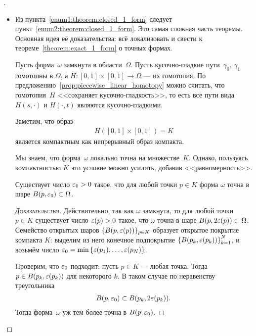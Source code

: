 \documentclass[../complex-analysis.tex]{subfiles}
\begin{document}
\begin{proof}[]\
 \begin{itemize}
  \item Из пункта~\ref{enum1:theorem:closed_1_form} следует пункт~\ref{enum2:theorem:closed_1_form}. Это самая сложная часть теоремы. Основная идея её доказательства: всё  локализовать и свести к теореме~\ref{theorem:exact_1_form} о точных формах.

   Пусть форма~$\omega$ замкнута в области~$\Omega$. Пусть кусочно-гладкие пути~$\gamma_0$, $\gamma_1$ гомотопны в $\Omega$, а $H \colon [0,1] \times [0,1] \to \Omega$ --- их гомотопия. По предложению~\ref{prop:piecewise_linear_homotopy} можно считать, что гомотопия~$ H $ <<сохраняет кусочно-гладкость>>, то есть все пути вида $ H(s, \cdot) $ и $ H(\cdot, t) $ являются кусочно-гладкими.

   Заметим, что образ
   \begin{align*}
    H([0,1] \times [0,1]) = K
   \end{align*}  является компактным как непрерывный образ компакта.

   Мы знаем, что форма~$ \omega $ локально точна на множестве~$ K $. Однако, пользуясь компактностью $ K $ это условие можно усилить, добавив <<равномерность>>.
   \begin{prop}
    \label{prop:eps_0:theorem:closed_1_form}
    Существует число $\varepsilon_0 > 0$ такое, что для любой точки $p \in K$ форма $\omega$ точна в шаре $B(p,\varepsilon_0) \subset \Omega$. 
   \end{prop}
   \begin{proof}[\normalfont\textsc{Доказательство}]
    Действительно, так как $\omega$ замкнута, то для любой точки $p \in K$ существует число $\varepsilon(p) > 0$ такое, что $\omega$ точна в шаре $B(p,2\varepsilon(p))\subset\Omega$. Семейство открытых шаров $\{B(p,\varepsilon(p))\}_{p \in K}$ образует открытое покрытие компакта $K$:  выделим из него конечное подпокрытие $\left\{ B(p_k, \varepsilon(p_k)) \right\}_{k=1}^{N}$, и возьмём число $\varepsilon_0 = \min \left\{ \varepsilon(p_1), \ldots, \varepsilon(p_N) \right\}$.

    Проверим, что $\varepsilon_0$ подходит: пусть $p \in K$ --- любая точка. Тогда $p \in B(p_k,\varepsilon(p_k))$ для некоторого $k$. В таком случае по неравенству треугольника
    \begin{align*}
     B(p, \varepsilon_0)\subset B(p_k,2\varepsilon(p_k)).
    \end{align*} Тогда форма~$\omega$ уж тем более точна в $B(p,\varepsilon_0)$.
   \end{proof}


\end{itemize}
\end{proof}
\end{document}
